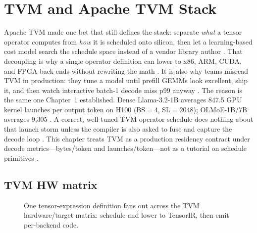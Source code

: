 \chapter{TVM and Apache TVM Stack}
\label{chap:ch16}

Apache TVM made one bet that still defines the stack: separate \emph{what} a tensor operator computes from \emph{how} it is scheduled onto silicon, then let a learning-based cost model search the schedule space instead of a vendor library author \citep{chen2018tvm}. That decoupling is why a single operator definition can lower to x86, ARM, CUDA, and FPGA back-ends without rewriting the math \citep{chen2018tvm,chen2020compilerbasedhardw}. It is also why teams misread TVM in production: they tune a model until prefill GEMMs look excellent, ship it, and then watch interactive batch-1 decode miss p99 anyway \citep{taxbreak2026,kwon2023vllm}.
The reason is the same one Chapter~1 established. Dense Llama-3.2-1B averages 847.5 GPU kernel launches per output token on H100 (BS${=}4$, SL${=}2048$); OLMoE-1B/7B averages 9{,}305 \citep{taxbreak2026}. A correct, well-tuned TVM operator schedule does nothing about that launch storm unless the compiler is also asked to fuse and capture the decode loop \citep{memoryfloor2026,nvidia2024cudagraphs}. This chapter treats TVM as a production residency contract under decode metrics---bytes/token and launches/token---not as a tutorial on schedule primitives \citep{patel2025llminference}.

\section{TVM HW matrix}
\label{sec:ch16_tvm_hw_matrix}


\begin{figure}[t]
\centering
{}
\caption{One tensor-expression definition fans out across the TVM hardware/target matrix: schedule and lower to TensorIR, then emit per-backend code.}
\label{fig:tvm_hw_matrix_pipeline}
\end{figure}

